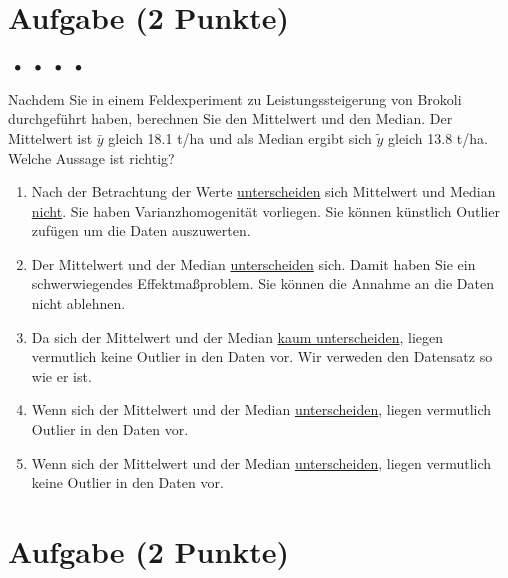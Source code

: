 \documentclass[a4paper, 9pt]{scrartcl}\usepackage[]{graphicx}\usepackage[]{xcolor}
\begin{document}
\section{Aufgabe \hfill (2 Punkte)}

\ifcollection
\begin{flushright}
\tiny\vspace{-2Ex}
\textbf{\examinhaltstart}
\exammodulemathstat $\;\bullet$
\exammodulestat $\;\bullet$
\exammodulestatbbv $\;\bullet$
\exammodulestatversuch $\;\bullet$
\exammodulebiostat
\vspace{-1Ex}
\end{flushright}
\fi




Nachdem Sie in einem Feldexperiment zu Leistungssteigerung von Brokoli durchgeführt haben, berechnen Sie den Mittelwert und den Median. Der Mittelwert ist $\bar{y}$ gleich 18.1 t/ha und als Median ergibt sich $\tilde{y}$ gleich 13.8 t/ha. Welche Aussage ist richtig?



\begin{enumerate}
\item [\textbf{A} \msquare] Nach der Betrachtung der Werte \underline{unterscheiden} sich Mittelwert und Median \underline{nicht}. Sie haben Varianzhomogenität vorliegen. Sie können künstlich Outlier zufügen um die Daten auszuwerten.
\item [\textbf{B} \msquare] Der  Mittelwert und der Median \underline{unterscheiden} sich. Damit haben Sie ein schwerwiegendes Effektmaßproblem. Sie können die Annahme an die Daten nicht ablehnen.
\item [\textbf{C} \msquare] Da sich der Mittelwert und der Median \underline{kaum unterscheiden}, liegen vermutlich keine Outlier in den Daten vor. Wir verweden den Datensatz so wie er ist.
\item [\textbf{D} \msquare] Wenn sich der Mittelwert und der Median \underline{unterscheiden}, liegen vermutlich Outlier in den Daten vor.
\item [\textbf{E} \msquare] Wenn sich der Mittelwert und der Median \underline{unterscheiden}, liegen vermutlich keine Outlier in den Daten vor.
\end{enumerate} 

\section{Aufgabe \hfill (2 Punkte)}
\end{document}
